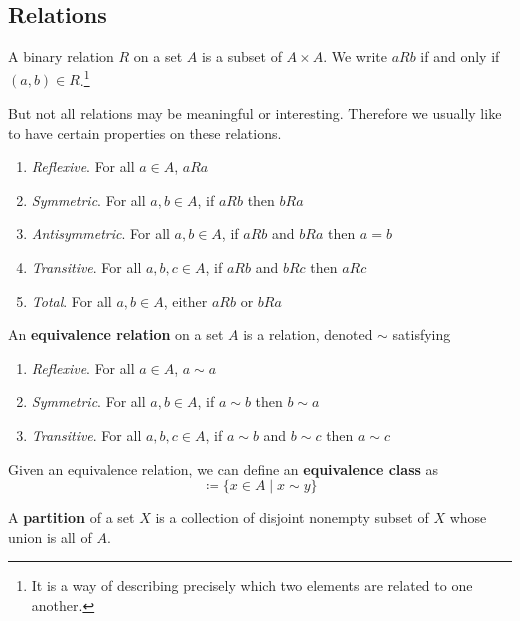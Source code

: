\documentclass{article}
\begin{document}
  \subsection{Relations}

    \begin{definition}[Relation]
      A binary relation $R$ on a set $A$ is a subset of $A \times A$. We write $aRb$ if and only if $(a,b) \in R$.\footnote{It is a way of describing precisely which two elements are related to one another.} 
    \end{definition} 

    But not all relations may be meaningful or interesting. Therefore we usually like to have certain properties on these relations. 
    \begin{enumerate}
      \item \textit{Reflexive}. For all $a \in A$, $aRa$
      \item \textit{Symmetric}. For all $a,b \in A$, if $aRb$ then $bRa$
      \item \textit{Antisymmetric}. For all $a,b \in A$, if $aRb$ and $bRa$ then $a=b$
      \item \textit{Transitive}. For all $a,b,c \in A$, if $aRb$ and $bRc$ then $aRc$
      \item \textit{Total}. For all $a,b \in A$, either $aRb$ or $bRa$
    \end{enumerate}

    \begin{definition}
      An \textbf{equivalence relation} on a set $A$ is a relation, denoted $\sim$ satisfying 
      \begin{enumerate}
        \item \textit{Reflexive}. For all $a \in A$, $a \sim a$
        \item \textit{Symmetric}. For all $a,b \in A$, if $a \sim b$ then $b \sim a$
        \item \textit{Transitive}. For all $a,b,c \in A$, if $a \sim b$ and $b \sim c$ then $a \sim c$
      \end{enumerate}
      Given an equivalence relation, we can define an \textbf{equivalence class} as 
      \begin{equation}
        [y] \coloneqq \{ x \in A \mid x \sim y \}
      \end{equation}
    \end{definition}

    \begin{definition}[Partition]
      A \textbf{partition} of a set $X$ is a collection of disjoint nonempty subset of $X$ whose union is all of $A$. 
    \end{definition} 
\end{document}
